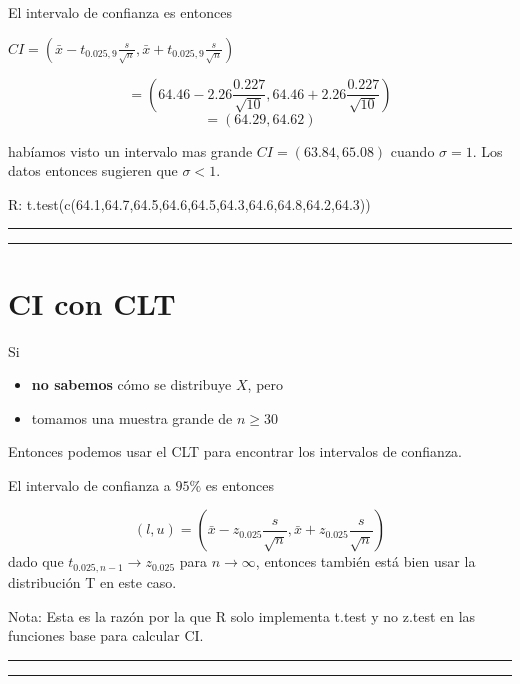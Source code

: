\documentclass[
]{book}
\providecommand{\tightlist}{%
  \setlength{\itemsep}{0pt}\setlength{\parskip}{0pt}}
\begin{document}
El intervalo de confianza es entonces

\(CI=(\bar{x}- t_{0.025,9}\frac{s}{\sqrt{n}},\bar{x}+t_{0.025,9} \frac{s}{\sqrt{n}})\)

\[=(64.46-2.26 \frac{0.227}{\sqrt{10}},64.46+2.26 \frac{0.227}{\sqrt{10}})\] \[=(64.29,64.62)\]

habíamos visto un intervalo mas grande \(CI=(63.84,65.08)\) cuando \(\sigma=1\). Los datos entonces sugieren que \(\sigma<1\).

R: t.test(c(64.1,64.7,64.5,64.6,64.5,64.3,64.6,64.8,64.2,64.3))

\begin{center}\rule{0.5\linewidth}{0.5pt}\end{center}

\begin{center}\rule{0.5\linewidth}{0.5pt}\end{center}

\hypertarget{ci-con-clt}{%
\section{CI con CLT}\label{ci-con-clt}}

Si

\begin{itemize}
\tightlist
\item
  \textbf{no sabemos} cómo se distribuye \(X\), pero
\item
  tomamos una muestra grande de \(n\ge 30\)
\end{itemize}

Entonces podemos usar el CLT para encontrar los intervalos de confianza.

El intervalo de confianza a \(95\%\) es entonces

\[(l,u)=(\bar{x}-z_{0.025} \frac{s}{\sqrt{n}}, \bar{x}+z_{0.025} \frac{s}{\sqrt{n}})\]
dado que \(t_{0.025, n-1} \rightarrow z_{0.025}\) para \(n \rightarrow \infty\), entonces también está bien usar la distribución T en este caso.

Nota: Esta es la razón por la que R solo implementa t.test y no z.test en las funciones base para calcular CI.

\begin{center}\rule{0.5\linewidth}{0.5pt}\end{center}

\begin{center}\rule{0.5\linewidth}{0.5pt}\end{center}
\end{document}
